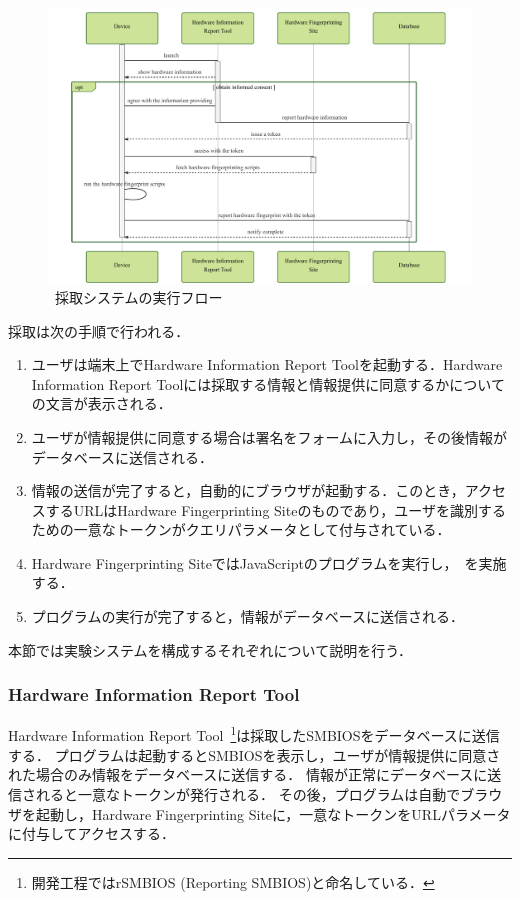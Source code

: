 \begin{figure}[H]
	\centering
    \includegraphics[width=\textwidth,pagebox=artbox]{fig/hero.pdf}
    \caption{\hfp~採取システムの実行フロー}
    \label{fig-hfp_system}
\end{figure}

採取は次の手順で行われる．

\begin{enumerate}
\item ユーザは端末上でHardware Information Report Toolを起動する．Hardware Information Report Toolには採取する情報と情報提供に同意するかについての文言が表示される．
\item ユーザが情報提供に同意する場合は署名をフォームに入力し，その後情報がデータベースに送信される．
\item 情報の送信が完了すると，自動的にブラウザが起動する．このとき，アクセスするURLはHardware Fingerprinting Siteのものであり，ユーザを識別するための一意なトークンがクエリパラメータとして付与されている．
\item Hardware Fingerprinting SiteではJavaScriptのプログラムを実行し，\hfp~を実施する．
\item プログラムの実行が完了すると，情報がデータベースに送信される．
\end{enumerate}
本節では実験システムを構成するそれぞれについて説明を行う．

\subsubsection{Hardware Information Report Tool}
Hardware Information Report Tool~\footnote{開発工程ではrSMBIOS (Reporting SMBIOS)と命名している．}は採取したSMBIOSをデータベースに送信する．
プログラムは起動するとSMBIOSを表示し，ユーザが情報提供に同意された場合のみ情報をデータベースに送信する．
情報が正常にデータベースに送信されると一意なトークンが発行される．
その後，プログラムは自動でブラウザを起動し，Hardware Fingerprinting Siteに，一意なトークンをURLパラメータに付与してアクセスする．


